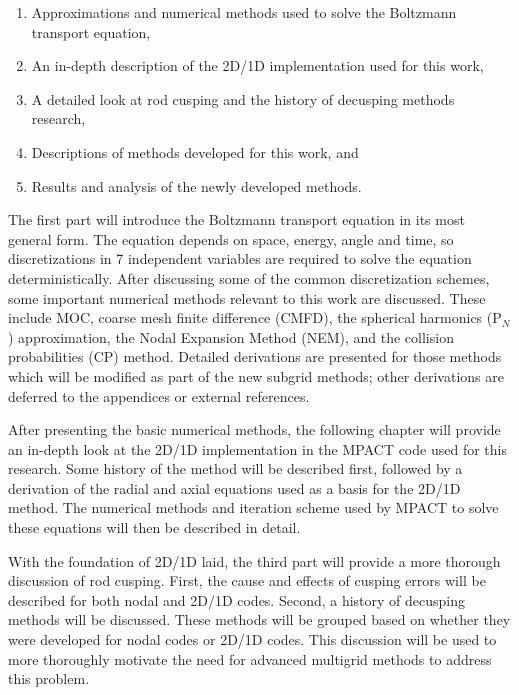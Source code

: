 \begin{enumerate}
    \item Approximations and numerical methods used to solve the Boltzmann transport equation,
    \item An in-depth description of the 2D/1D implementation used for this work,
    \item A detailed look at rod cusping and the history of decusping methods research,
    \item Descriptions of methods developed for this work, and
    \item Results and analysis of the newly developed methods.
\end{enumerate}

The first part will introduce the Boltzmann transport equation in its most general form.  The equation depends on space, energy, angle and time, so discretizations in 7 independent variables are required to solve the equation deterministically.  After discussing some of the common discretization schemes, some important numerical methods relevant to this work are discussed.  These include MOC, coarse mesh finite difference (CMFD), the spherical harmonics (P$_N$) approximation, the Nodal Expansion Method (NEM), and the collision probabilities (CP) method.  Detailed derivations are presented for those methods which will be modified as part of the new subgrid methods; other derivations are deferred to the appendices or external references.

After presenting the basic numerical methods, the following chapter will provide an in-depth look at the 2D/1D implementation in the MPACT code used for this research.  Some history of the method will be described first, followed by a derivation of the radial and axial equations used as a basis for the 2D/1D method.  The numerical methods and iteration scheme used by MPACT to solve these equations will then be described in detail.

With the foundation of 2D/1D laid, the third part will provide a more thorough discussion of rod cusping.  First, the cause and effects of cusping errors will be described for both nodal and 2D/1D codes.  Second, a history of decusping methods will be discussed.  These methods will be grouped based on whether they were developed for nodal codes or 2D/1D codes.  This discussion will be used to more thoroughly motivate the need for advanced multigrid methods to address this problem.

